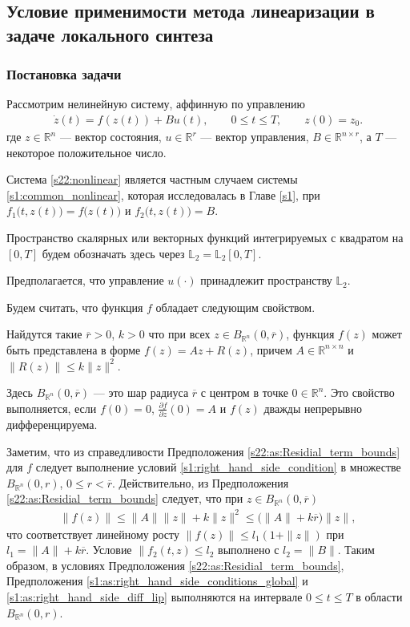 \documentclass[../main.tex]{subfiles}
\begin{document}
\subsection{Условие применимости метода линеаризации в задаче локального синтеза} 

\subsubsection{Постановка задачи}

Рассмотрим нелинейную систему, аффинную по управлению
\begin{gather}\label{s22:nonlinear}
    \dot{z}(t)=f(z(t))+B u(t),\qquad 0 \leqslant t \leqslant T, \qquad z(0) = z_0.
\end{gather}
 где $ z \in \mathbb{R}^n $ --- вектор состояния, $ u \in \mathbb{R}^r $ --- вектор управления, $B \in \mathbb{R}^{n \times r}$, а $ 
T$ --- некоторое положительное число. 

Система \eqref{s22:nonlinear} является частным случаем системы \eqref{s1:common_nonlinear}, которая исследовалась в Главе \ref{s1}, при $f_1\big(t,z(t)\big) = f\big(z(t)\big)$ и $f_2\big(t,z(t)\big) = B$. 

Пространство скалярных или векторных функций интегрируемых с квадратом  на $ [0,T] $ будем обозначать здесь через $ \mathbb{L}_2 = \mathbb{L}_2[0,T] $.  

Предполагается, что управление $u(\cdot)$  принадлежит пространству $\mathbb{L}_2 $.

Будем считать, что функция $f$ обладает следующим свойством.

\begin{assumption}\label{s22:as:Residial_term_bounds}
     Найдутся такие  $\overline{r}>0$, $k>0$  что при всех $ z \in B_{\mathbb{R}^n}(0,\overline{r}) $, функция  $f(z)$ может быть представлена в форме  $ f(z) = Az + R(z) $, причем $A \in \mathbb{R}^{n \times n}$ и $ \|R(z) \| \leqslant k \| z\|^2  $. 
\end{assumption}
Здесь $ B_{\mathbb{R}^n}(0,\overline{r}) $ --- это шар радиуса $\overline{r}$  с центром в точке $0 \in \mathbb{R}^n$. 
Это свойство выполняется, если $f(0) = 0 $, $\frac{\partial f}{\partial z}(0) 
= A $ и $f(z)$ дважды непрерывно дифференцируема. 

Заметим, что из справедливости Предположения \ref{s22:as:Residial_term_bounds} для $f$ следует выполнение условий \eqref{s1:right_hand_side_condition} в множестве $ B_{\mathbb{R}^n}(0,r)$, $0 \leqslant r < \overline{r}$. 
Действительно, из Предположения  \ref{s22:as:Residial_term_bounds}  следует, что при $ z \in B_{\mathbb{R}^n}(0,\overline{r}) $
\begin{gather*}
	\|f(z)\| \leqslant \|A\| \|z\| + k \|z\|^2 \leqslant \big(\|A\| + k \overline{r} \big) \|z\|,
\end{gather*}
что соответствует линейному росту $ \|f(z)\| \leqslant l_1 (1 + \|z\|)$ при $l_1 = \|A\| + k \overline{r}$. 
Условие $\|f_2(t,z) \leqslant l_2 $ выполнено с $l_2 = \|B\|$.
Таким образом, в условиях Предположения \ref{s22:as:Residial_term_bounds}, Предположения \ref{s1:as:right_hand_side_conditions_global} и \ref{s1:as:right_hand_side_diff_lip} выполняются на интервале $ 0 \leqslant t \leqslant T$ в области $B_{\mathbb{R}^n}(0,r)$.
\end{document}
